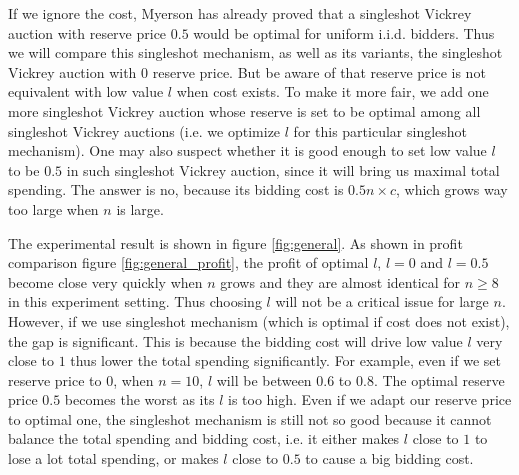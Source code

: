 If we ignore the cost, Myerson has already proved that a singleshot Vickrey
auction with reserve price $0.5$ would be optimal for uniform i.i.d. bidders.
Thus we will compare this singleshot mechanism, as well as its variants, the
singleshot Vickrey auction with $0$ reserve price. But be aware of that reserve
price is not equivalent with low value $l$  when cost exists. To make it more fair,
we add one more singleshot Vickrey auction whose reserve is set to be optimal
among all singleshot Vickrey auctions (i.e. we optimize $l$ for this particular
singleshot mechanism).
One may also suspect whether it is good enough to set low value $l$ to be $0.5$
in such singleshot Vickrey auction, since it will bring us maximal total
spending. The answer is no, because its bidding cost is $0.5 n \times c$, which
grows way too large when $n$ is large.

The experimental result is shown in figure \ref{fig:general}. As shown in
profit comparison figure \ref{fig:general_profit}, the profit of optimal $l$,
$l = 0$ and $l = 0.5$ become close very quickly when $n$ grows and they are
almost identical for $n \geq 8$ in this experiment setting. Thus choosing $l$
will not be a critical issue for large $n$. However, if we use singleshot
mechanism (which is optimal if cost does not exist), the gap is significant.
This is because the bidding cost will drive low value $l$ very
close to $1$ thus lower the total spending significantly. For example, even if
we set reserve price to $0$, when $n = 10$, $l$ will be between $0.6$ to $0.8$.
The optimal reserve price $0.5$ becomes the worst as its $l$ is too high. 
Even if we adapt our reserve price to optimal one, the singleshot mechanism is
still not so good because it cannot balance the total spending and bidding cost,
i.e. it either makes $l$ close to $1$ to lose a lot total spending, or makes
$l$ close to $0.5$ to cause a big bidding cost.
